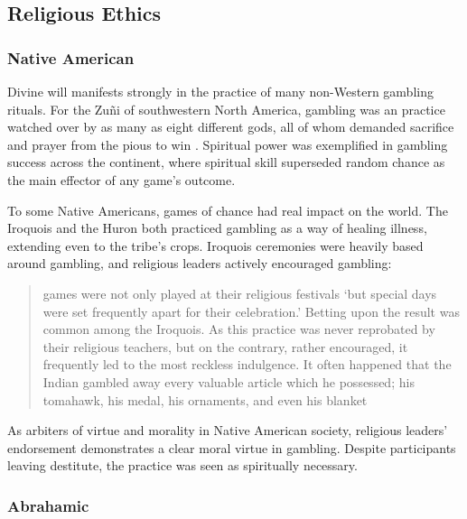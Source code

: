\documentclass[american]{../../../coursework}
\begin{document}
\subsection{Religious Ethics}

\subsubsection{Native American}

Divine will manifests strongly in the practice of many non-Western gambling rituals. For the Zuñi of southwestern North America, gambling was an practice watched over by as many as eight different gods, all of whom demanded sacrifice and prayer from the pious to win \parencite{Ste03,Bin07}. Spiritual power was exemplified in gambling success across the continent, where spiritual skill superseded random chance as the main effector of any game's outcome.

To some Native Americans, games of chance had real impact on the world. The Iroquois \parencite{Bea96} and the Huron \parencite{Her56} both practiced gambling as a way of healing illness, extending even to the tribe's crops. Iroquois ceremonies were heavily based around gambling, and religious leaders actively encouraged gambling:

\begin{quote}
    games were not only played at their religious festivals `but special days were set frequently apart for their celebration.' Betting upon the result was common among the Iroquois. As this practice was never reprobated by their religious teachers, but on the contrary, rather encouraged, it frequently led to the most reckless indulgence. It often happened that the Indian gambled away every valuable article which he possessed; his tomahawk, his medal, his ornaments, and even his blanket
    
    \parencite[116]{Cul07}
\end{quote}

As arbiters of virtue and morality in Native American society, religious leaders' endorsement demonstrates a clear moral virtue in gambling. Despite participants leaving destitute, the practice was seen as spiritually necessary.

\subsubsection{Abrahamic}
\end{document}
